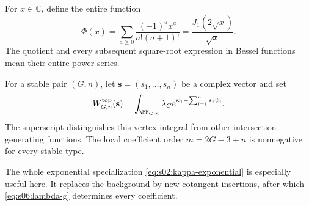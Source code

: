 For $x\in\mathbb C$, define the entire function
\begin{equation}\label{eq:s06:phi}
 \Phi(x)=\sum_{a\geq0}\frac{(-1)^a x^a}{a!(a+1)!}
        =\frac{J_1(2\sqrt x)}{\sqrt x}.
\end{equation}
The quotient and every subsequent square-root expression in Bessel
functions mean their entire power series.

For a stable pair $(G,n)$, let $\mathbf s=(s_1,\ldots,s_n)$
be a complex vector and set
\begin{equation}\label{eq:s06:vertex-definition}
 W^{\rm top}_{G,n}(\mathbf s)
  =\int_{\MM_{G,n}}\lambda_G
                   e^{\kappa_1-\sum_{i=1}^n s_i\psi_i}.
\end{equation}
The superscript distinguishes this vertex integral from other
intersection generating functions. The local coefficient order
$m=2G-3+n$ is nonnegative for every stable type.

The whole exponential specialization
\eqref{eq:s02:kappa-exponential} is especially useful here. It
replaces the background by new cotangent insertions, after which
\eqref{eq:s06:lambda-g} determines every coefficient.

